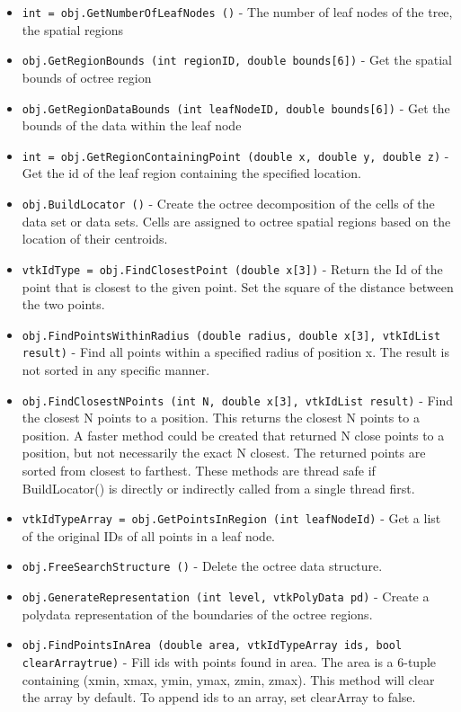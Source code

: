 \begin{itemize}
\item  \verb|int = obj.GetNumberOfLeafNodes ()| -    The number of leaf nodes of the tree, the spatial regions

\item  \verb|obj.GetRegionBounds (int regionID, double bounds[6])| -    Get the spatial bounds of octree region

\item  \verb|obj.GetRegionDataBounds (int leafNodeID, double bounds[6])| -     Get the bounds of the data within the leaf node

\item  \verb|int = obj.GetRegionContainingPoint (double x, double y, double z)| -     Get the id of the leaf region containing the specified location.

\item  \verb|obj.BuildLocator ()| -  Create the octree decomposition of the cells of the data set
 or data sets.  Cells are assigned to octree spatial regions
 based on the location of their centroids.

\item  \verb|vtkIdType = obj.FindClosestPoint (double x[3])| -  Return the Id of the point that is closest to the given point.
 Set the square of the distance between the two points.

\item  \verb|obj.FindPointsWithinRadius (double radius, double x[3], vtkIdList result)| -  Find all points within a specified radius of position x.
 The result is not sorted in any specific manner.

\item  \verb|obj.FindClosestNPoints (int N, double x[3], vtkIdList result)| -  Find the closest N points to a position. This returns the closest
 N points to a position. A faster method could be created that returned
 N close points to a position, but not necessarily the exact N closest.
 The returned points are sorted from closest to farthest.
 These methods are thread safe if BuildLocator() is directly or
 indirectly called from a single thread first.

\item  \verb|vtkIdTypeArray = obj.GetPointsInRegion (int leafNodeId)| -  Get a list of the original IDs of all points in a leaf node.

\item  \verb|obj.FreeSearchStructure ()| -  Delete the octree data structure. 

\item  \verb|obj.GenerateRepresentation (int level, vtkPolyData pd)| -  Create a polydata representation of the boundaries of
 the octree regions.  

\item  \verb|obj.FindPointsInArea (double area, vtkIdTypeArray ids, bool clearArraytrue)| -  Fill ids with points found in area.  The area is a 6-tuple containing
 (xmin, xmax, ymin, ymax, zmin, zmax).
 This method will clear the array by default.  To append ids to an array,
 set clearArray to false.

\end{itemize}
